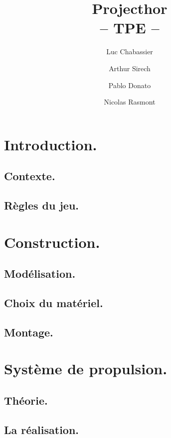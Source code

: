 \documentclass{report}
\title{Projecthor\\-- TPE --}
\author{Luc Chabassier \and Arthur Sirech \and Pablo Donato \and Nicolas Rasmont}
\begin{document}
\maketitle

\tableofcontents

\part{Introduction.}
\chapter{Contexte.} \label{intro}
% 

\chapter{Règles du jeu.} \label{regles}
% 

\part{Construction.}
\chapter{Modélisation.} \label{moter}
% 

\chapter{Choix du matériel.} \label{mater} %
% 
% 

\chapter{Montage.} \label{mont}
% 

\part{Système de propulsion.}
\chapter{Théorie.} \label{theo}
% 

\chapter{La réalisation.} \label{rea}
% 
\end{document}
